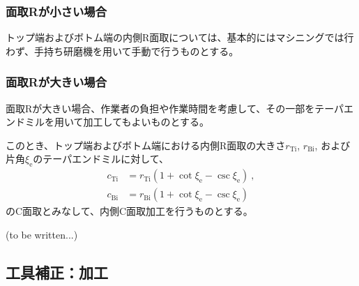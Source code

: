 \subsubsection{面取Rが小さい場合}
トップ端およびボトム端の内側R面取については、基本的にはマシニングでは行わず、手持ち研磨機を用いて手動で行うものとする。

\subsubsection{面取Rが大きい場合}
面取Rが大きい場合、作業者の負担や作業時間を考慮して、その一部をテーパエンドミルを用いて加工してもよいものとする。

このとき、トップ端およびボトム端における内側R面取の大きさ$r_\mathrm{Ti}$, $r_\mathrm{Bi}$, および片角$\xi_\mathrm e$のテーパエンドミルに対して、
\begin{align*}
  c_\mathrm{Ti} &= r_\mathrm{Ti}\left(1+\cot\xi_\mathrm e-\csc\xi_\mathrm e\right)\ ,\\
  c_\mathrm{Bi} &= r_\mathrm{Bi}\left(1+\cot\xi_\mathrm e-\csc\xi_\mathrm e\right)
\end{align*}
のC面取とみなして、内側C面取加工を行うものとする。



\clearpage
(to be written...)


\clearpage
\modHeadsection{\dimple}


\subsection{工具補正：\dimple 加工}

